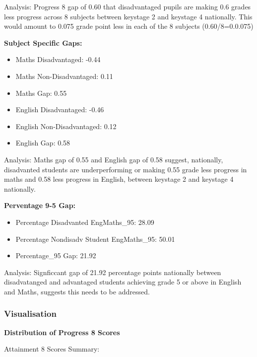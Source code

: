 \documentclass[
  letterpaper,
  DIV=11,
  numbers=noendperiod]{scrartcl}
\begin{document}
Analysis: Progress 8 gap of 0.60 that disadvantaged pupils are making
0.6 grades less progress across 8 subjects between keystage 2 and
keystage 4 nationally. This would amount to 0.075 grade point less in
each of the 8 subjects (0.60/8=0.0.075)

\textbf{Subject Specific Gaps:}

\begin{itemize}
\item
  Maths Disadvantaged: -0.44
\item
  Maths Non-Disadvantaged: 0.11
\item
  Maths Gap: 0.55
\item
  English Disadvantaged: -0.46
\item
  English Non-Disadvantaged: 0.12
\item
  English Gap: 0.58
\end{itemize}

Analysis: Maths gap of 0.55 and English gap of 0.58 suggest, nationally,
disadvanted students are underperforming or making 0.55 grade less
progress in maths and 0.58 less progress in English, between keystage 2
and keystage 4 nationally.

\textbf{Perventage 9-5 Gap:}

\begin{itemize}
\item
  Percentage Disadvanted EngMaths\_95: 28.09
\item
  Percentage Nondisadv Student EngMaths\_95: 50.01
\item
  Percentage\_95 Gap: 21.92
\end{itemize}

Analysis: Signficcant gap of 21.92 percentage points nationally between
disadvatanged and advantaged students achieving grade 5 or above in
English and Maths, suggests this needs to be addressed.

\subsubsection{Visualisation}\label{visualisation}

\textbf{Distribution of Progress 8 Scores}

Attainment 8 Scores Summary:
\end{document}
